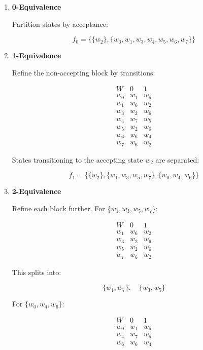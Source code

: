\documentclass[12pt,a4paper,openany]{article}
\begin{document}
\begin{enumerate}



\item \textbf{0-Equivalence}

Partition states by acceptance:

\[
f_0 =
\bigl\{
\{w_2\},
\{w_0,w_1,w_3,w_4,w_5,w_6,w_7\}
\bigr\}
\]


\item \textbf{1-Equivalence}

Refine the non-accepting block by transitions:

\[
\begin{array}{c|cc}
W & 0 & 1 \\ \hline
w_0 & w_1 & w_5 \\
w_1 & w_6 & w_2 \\
w_3 & w_2 & w_6 \\
w_4 & w_7 & w_5 \\
w_5 & w_2 & w_6 \\
w_6 & w_6 & w_4 \\
w_7 & w_6 & w_2
\end{array}
\]

States transitioning to the accepting state \(w_2\) are separated:

\[
f_1 =
\bigl\{
\{w_2\},
\{w_1,w_3,w_5,w_7\},
\{w_0,w_4,w_6\}
\bigr\}
\]



\item \textbf{2-Equivalence}

Refine each block further. For \(\{w_1,w_3,w_5,w_7\}\):

\[
\begin{array}{c|cc}
W & 0 & 1 \\ \hline
w_1 & w_6 & w_2 \\
w_3 & w_2 & w_6 \\
w_5 & w_2 & w_6 \\
w_7 & w_6 & w_2
\end{array}
\]

This splits into:

\[
\{w_1,w_7\}, \quad \{w_3,w_5\}
\]

For \(\{w_0,w_4,w_6\}\):

\[
\begin{array}{c|cc}
W & 0 & 1 \\ \hline
w_0 & w_1 & w_5 \\
w_4 & w_7 & w_5 \\
w_6 & w_6 & w_4
\end{array}
\]


\end{enumerate}
\end{document}
